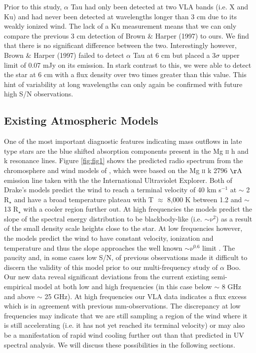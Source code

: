 \documentclass[iop]{emulateapj}
\begin{document}
Prior to this study, $\alpha$ Tau had only been detected at two VLA bands (i.e. X and Ku) and had never been detected at wavelengths longer than 3 cm due to its weakly ionized wind. The lack of a Ku measurement means that we can only compare the previous 3 cm detection of Brown $\&$ Harper (1997) to ours. We find that there is no significant difference between the two. Interestingly however, Brown $\&$ Harper (1997) failed to detect $\alpha$ Tau at 6 cm but placed a 3$\sigma$ upper limit of 0.07 mJy on its emission. In stark contrast to this, we were able to detect the star at 6 cm with a flux density over two times greater than this value. This hint of variability at long wavelengths can only again be confirmed with future high S/N observations.


\subsection{Existing Atmospheric Models} \label{disc2}
One of the most important diagnostic features indicating mass outflows in late type stars are the blue shifted absorption components present in the Mg {\textsc{ii}} h and k resonance lines. Figure \ref{fig:fig1} shows the predicted radio spectrum from the chromosphere and wind models of \cite{1985pssl.proc..351D}, which were based on the Mg {\textsc{ii}} k 2796 $\rm{\AA}$ emission line taken with the the International Ultraviolet Explorer. Both of Drake's models predict the wind to reach a terminal velocity of 40 km s${}^{-1}$ at $\sim$ 2 R${}_{\star}$ and have a broad temperature plateau with T $\approx$ 8,000 K between 1.2 and $\sim$ 13 R${}_{\star}$ with a cooler region further out. At high frequencies the models predict the slope of the spectral energy distribution to be blackbody-like (i.e. $\sim \nu ^{2}$) as a result of the small density scale heights close to the star. At low frequencies however, the models predict the wind to have constant velocity, ionization and temperature and thus the slope approaches the well known $\sim \nu ^{0.6}$ limit \citep{1975MNRAS.170...41W,1975AA....39..217O,1975AA....39....1P}. The paucity and, in some cases low S/N, of previous observations made it difficult to discern the validity of this model prior to our multi-frequency study of $\alpha$ Boo. Our new data reveal significant deviations from the current existing semi-empirical model at both low and high frequencies (in this case below $\sim$ 8 GHz and above $\sim$ 25 GHz). At high frequencies our VLA data indicates a flux excess which is in agreement with previous mm-observations. The  discrepancy at low frequencies may indicate that we are still sampling a region of the wind where it is still accelerating (i.e. it has not yet reached its terminal velocity) or may also be a manifestation of rapid wind cooling further out than that predicted in UV spectral analysis. We will discuss these possibilities in the following sections.
\end{document}
